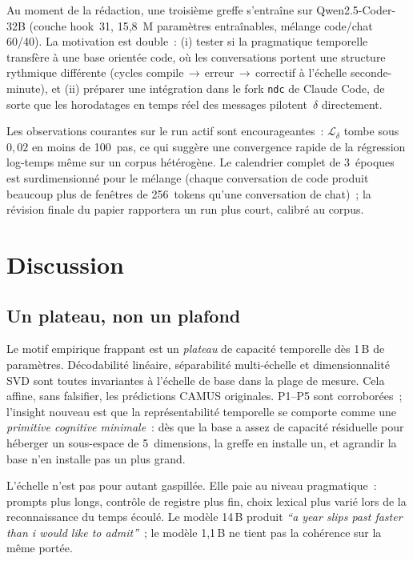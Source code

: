 \documentclass[10pt,twocolumn,letterpaper]{article}
\begin{document}
Au moment de la rédaction, une troisième greffe s'entraîne sur Qwen2.5-Coder-32B (couche hook~31, 15{,}8~M paramètres entraînables, mélange code/chat 60/40). La motivation est double~: (i) tester si la pragmatique temporelle transfère à une base orientée code, où les conversations portent une structure rythmique différente (cycles compile\,$\rightarrow$\,erreur\,$\rightarrow$\,correctif à l'échelle seconde-minute), et (ii) préparer une intégration dans le fork \texttt{ndc} de Claude Code, de sorte que les horodatages en temps réel des messages pilotent~$\delta$ directement.

Les observations courantes sur le run actif sont encourageantes~: $\mathcal{L}_\delta$ tombe sous $0{,}02$ en moins de 100~pas, ce qui suggère une convergence rapide de la régression log-temps même sur un corpus hétérogène. Le calendrier complet de 3~époques est surdimensionné pour le mélange (chaque conversation de code produit beaucoup plus de fenêtres de 256~tokens qu'une conversation de chat)~; la révision finale du papier rapportera un run plus court, calibré au corpus.

\section{Discussion}

\subsection{Un plateau, non un plafond}

Le motif empirique frappant est un \emph{plateau} de capacité temporelle dès 1\,B de paramètres. Décodabilité linéaire, séparabilité multi-échelle et dimensionnalité SVD sont toutes invariantes à l'échelle de base dans la plage de mesure. Cela affine, sans falsifier, les prédictions CAMUS originales. P1--P5 sont corroborées~; l'insight nouveau est que la représentabilité temporelle se comporte comme une \emph{primitive cognitive minimale}~: dès que la base a assez de capacité résiduelle pour héberger un sous-espace de 5~dimensions, la greffe en installe un, et agrandir la base n'en installe pas un plus grand.

L'échelle n'est pas pour autant gaspillée. Elle paie au niveau pragmatique~: prompts plus longs, contrôle de registre plus fin, choix lexical plus varié lors de la reconnaissance du temps écoulé. Le modèle 14\,B produit \emph{``a year slips past faster than i would like to admit''}~; le modèle 1{,}1\,B ne tient pas la cohérence sur la même portée.
\end{document}
